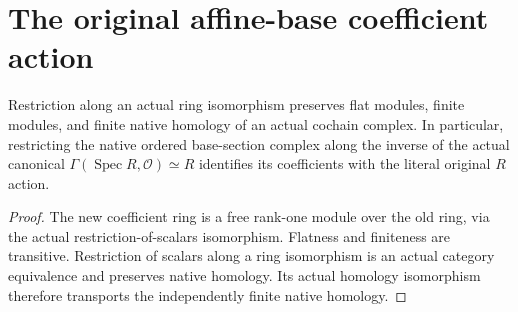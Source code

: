 \section{The original affine-base coefficient action}

\begin{lemma}
\label{lem:kn-derived-original-scalar-coefficients}
\leanok
Restriction along an actual ring isomorphism preserves flat modules,
finite modules, and finite native homology of an actual cochain
complex.  In particular, restricting the native ordered base-section
complex along the inverse of the actual canonical
$\Gamma(\operatorname{Spec}R,\mathcal O)\simeq R$ identifies its
coefficients with the literal original $R$ action.
\end{lemma}
\begin{proof}
The new coefficient ring is a free rank-one module over the old
ring, via the actual restriction-of-scalars isomorphism.  Flatness
and finiteness are transitive.  Restriction of scalars along a ring
isomorphism is an actual category equivalence and preserves native
homology.  Its actual homology isomorphism therefore transports
the independently finite native homology.
\end{proof}
